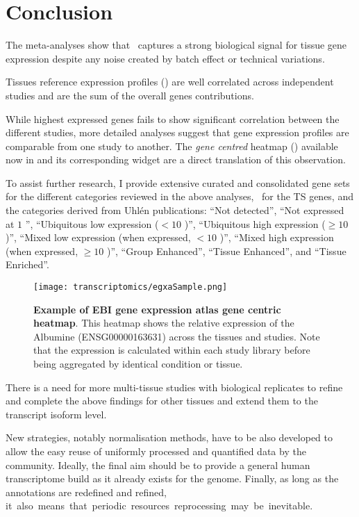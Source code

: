 \section{Conclusion}

The meta-analyses show that \Rnaseq\ captures
a strong biological signal for tissue gene expression
despite any noise created by batch effect or technical variations.\mybr\

Tissues reference expression profiles (\treps) are well correlated
across independent studies and are the sum of the overall genes contributions.\mybr\

While highest expressed genes fails to show significant correlation between
the different studies,
more detailed analyses suggest that
gene expression profiles are comparable from one study to another.
The \emph{gene centred} heatmap () available now
in 
and its corresponding widget
are a direct translation of this observation.\mybr\

To assist further research,
I provide extensive curated and consolidated gene sets
for the different categories reviewed in the above analyses,
\ie\ for the \gls{TS} genes,
and the categories derived from Uhlén publications:
\enquote{Not detected}, \enquote{Not expressed at $1$ \FPKM},
\enquote{Ubiquitous low expression ($< 10$ \FPKM)},
\enquote{Ubiquitous high expression ($≥ 10$ \FPKM)},
\enquote{Mixed low expression (when expressed, $< 10$ \FPKM)},
\enquote{Mixed high expression (when expressed, $≥ 10$ \FPKM)},
\enquote{Group Enhanced},
\enquote{Tissue Enhanced},
and \enquote{Tissue Enriched}.\mybr\

\begin{sidewaysfigure}
    \texttt{[image: transcriptomics/egxaSample.png]}\centering
    \caption[Example of EBI gene expression atlas gene centric heatmap]%
    {\label{fig:egxaSample}\textbf{Example of EBI gene expression atlas gene centric heatmap}.
    This heatmap shows the relative expression of the Albumine (ENSG00000163631)
    across the tissues and studies.
    Note that the expression is calculated within each study library before
    being aggregated by identical condition or tissue.}
\end{sidewaysfigure}

There is a need for more multi-tissue studies
with biological replicates to refine and complete the above findings
for other tissues and extend them to the transcript isoform level.\mybr\

New strategies, notably normalisation methods, have to be also developed
to allow the easy reuse of uniformly processed and quantified data by
the community.
Ideally, the final aim should be to provide a general human transcriptome build
as it already exists for the genome.
Finally, as long as the annotations are redefined and refined,
it~also~means~that~periodic~resources~reprocessing~may~be~inevitable.\mybr\


